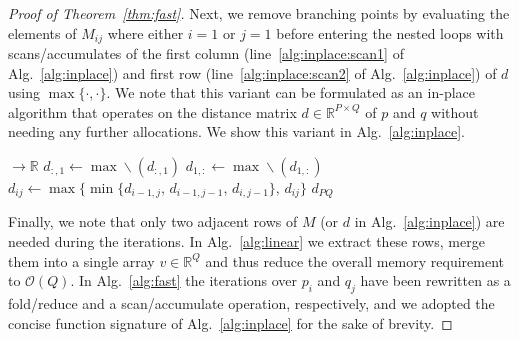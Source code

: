 \begin{proof}[Proof of Theorem~\ref{thm:fast}]
Next, we remove branching points by evaluating the elements of $M_{ij}$ where either $i=1$ or $j=1$ before entering the nested loops with scans/accumulates of the first column (line~\ref{alg:inplace:scan1} of Alg.~\ref{alg:inplace}) and first row (line~\ref{alg:inplace:scan2} of Alg.~\ref{alg:inplace}) of $d$ using $\max\{ \cdot, \cdot \}$.
We note that this variant can be formulated as an in-place algorithm that operates on the distance matrix $d \in \mathbb{R}^{P \times Q}$ of $p$ and $q$ without needing any further allocations.
We show this variant in Alg.~\ref{alg:inplace}.

\begin{algorithm}
    \caption{In-place variant of Alg.~\ref{alg:vanilla}. This variant directly maps a given distance matrix $d_{ij} = \|p_i - q_j\|_\mathcal{S}$  to the corresponding Fr\'echet distance. Note that this variant has no explicit branching points.}
    \label{alg:inplace}
    \begin{algorithmic}[1]
         $\to \mathbb{R}$
            \State $d_{:,1} \gets \max\!\backslash(d_{:,1})$ \label{alg:inplace:scan1}
            \State $d_{1,:} \gets \max\!\backslash(d_{1,:})$ \label{alg:inplace:scan2}
            \Statex
                    \State $d_{ij} \gets \max\{\min\{d_{i-1,j},\, d_{i-1,j-1},\, d_{i,j-1}\},\, d_{ij} \}$
                \EndFor
            \EndFor
            \Statex
            \State \Return $d_{PQ}$   
        \EndFunction
    \end{algorithmic}
\end{algorithm}

Finally, we note that only two adjacent rows of $M$ (or $d$ in Alg.~\ref{alg:inplace}) are needed during the iterations.
In Alg.~\ref{alg:linear} we extract these rows, merge them into a single array $v \in \mathbb{R}^Q$ and thus reduce the overall memory requirement to $\mathcal{O}(Q)$.
In Alg.~\ref{alg:fast} the iterations over $p_i$ and $q_j$ have been rewritten as a fold/reduce and a scan/accumulate operation, respectively, and we adopted the concise function signature of Alg.~\ref{alg:inplace} for the sake of brevity.
\end{proof}

